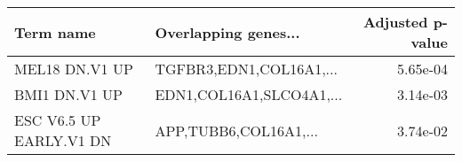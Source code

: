 \begin{tabular}{llr}
\toprule
              Term name &     Overlapping genes... &  Adjusted p-value \\
\midrule
         MEL18 DN.V1 UP &  TGFBR3,EDN1,COL16A1,... &          5.65e-04 \\
          BMI1 DN.V1 UP & EDN1,COL16A1,SLCO4A1,... &          3.14e-03 \\
ESC V6.5 UP EARLY.V1 DN &    APP,TUBB6,COL16A1,... &          3.74e-02 \\
\bottomrule
\end{tabular}
